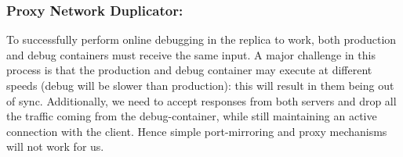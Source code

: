 \subsubsection{Proxy Network Duplicator:} 
\label{sec:proxyDuplicator}
To successfully perform online debugging in the replica to work, both production and debug containers must receive the same input.
A major challenge in this process is that the production and debug container may execute at different speeds (debug will be slower than production): this will result in them being out of sync.
Additionally, we need to accept responses from both servers and drop all the traffic coming from the debug-container, while still maintaining an active connection with the client.
Hence simple port-mirroring and proxy mechanisms will not work for us. 

